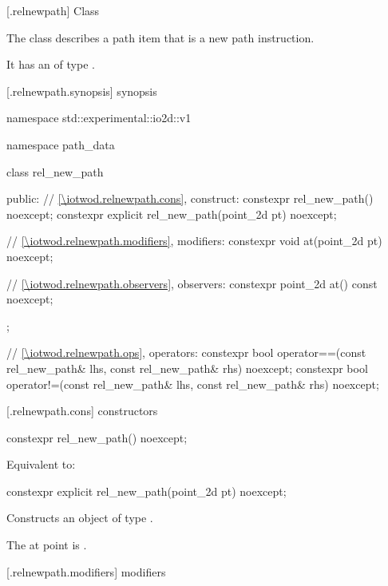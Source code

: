  [\iotwod.relnewpath] {Class }%

\pnum
{}%
The class  describes a path item that is a new path instruction.

\pnum
It has an  of type .

 [\iotwod.relnewpath.synopsis] { synopsis}%

\begin{codeblock}
namespace std::experimental::io2d::v1 {
  namespace path_data {
    class rel_new_path {
    public:
      // \ref{\iotwod.relnewpath.cons}, construct:
      constexpr rel_new_path() noexcept;
      constexpr explicit rel_new_path(point_2d pt) noexcept;

      // \ref{\iotwod.relnewpath.modifiers}, modifiers:
      constexpr void at(point_2d pt) noexcept;

      // \ref{\iotwod.relnewpath.observers}, observers:
      constexpr point_2d at() const noexcept;
    };
    
  // \ref{\iotwod.relnewpath.ops}, operators:
  constexpr bool operator==(const rel_new_path& lhs, const rel_new_path& rhs) 
    noexcept;
  constexpr bool operator!=(const rel_new_path& lhs, const rel_new_path& rhs) 
    noexcept;
  }
}
\end{codeblock}

 [\iotwod.relnewpath.cons] { constructors}%

%
\begin{itemdecl}
constexpr rel_new_path() noexcept;
\end{itemdecl}
\begin{itemdescr}
\pnum
\effects
Equivalent to: 
\end{itemdescr}

%
\begin{itemdecl}
constexpr explicit rel_new_path(point_2d pt) noexcept;
\end{itemdecl}
\begin{itemdescr}
\pnum
\effects
Constructs an object of type .

\pnum
The at point is .
\end{itemdescr}

 [\iotwod.relnewpath.modifiers]{ modifiers}%

